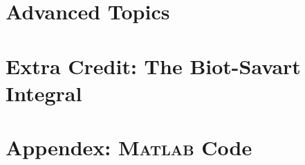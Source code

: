 \documentclass[11pt]{article}
\begin{document}
\section{Advanced Topics}

\subsection{}

\subsection{}

\section{Extra Credit: The Biot-Savart Integral}

\section*{Appendex: \textsc{Matlab} Code}

\end{document}
